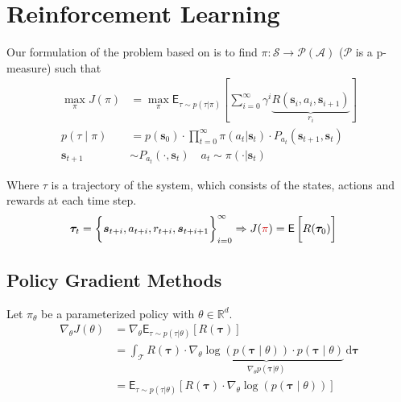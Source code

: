 \documentclass[a4paper,12pt, oneside, twocolumn]{scrartcl}
\newcommand{\rot}[2][rot]{\textcolor{#1}{#2}}
\begin{document}
\vspace{-1em} %

\section*{Reinforcement Learning}

Our formulation of the problem based on \cite{sutton_barto_2018} is 
to find $\pi: \mathcal{S} \to \mathcal{P}(\mathcal{A})$ ($\mathcal{P}$ is a p-measure) such that  
%
\begin{align*}
    \max_{\pi} J(\pi) &= \max_{\pi} \mathsf{E}_{\tau \sim p(\tau|\pi)} 
    \left[ 
        \sum_{i=0}^{\infty} \gamma^i \underbrace{R(\bm{s}_i, a_i, \bm{s}_{i+1})}_{r_i}
    \right]
    \\
    p(\tau \mid \pi) &= p(\bm{s}_0) \cdot \prod_{t=0}^{\infty} \pi(a_t|\bm{s}_t) \cdot P_{a_t}(\bm{s}_{t+1}, \bm{s}_t)
    \\
    \bm{s}_{t+1} &\sim P_{a_t}(\cdot , \bm{s}_t) 
    \quad
    a_t \sim \pi(\cdot | \bm{s}_t)
\end{align*}

Where $\tau$ is a trajectory of the system, which consists of the states, actions and rewards at each time step.
%
\small{
    \begin{align*}
        \bm{\tau}_t
        &=
        \left\{
            \vphantom{\int}
            \bm{s}_{t+i}, a_{t+i}, r_{t+i}, \bm{s}_{t+i+1} 
        \right\}_{i=0}^{\infty}
        \Rightarrow
        J(\rot{\pi}) 
        =
        \mathsf{E}
        \left[
            \vphantom{\int}
            R(\bm{\tau}_0)
        \right]
    \end{align*}
}

\subsection*{Policy Gradient Methods}

Let $\pi_{\theta}$ be a parameterized policy with $\theta \in \mathbb{R}^d$.
\begin{align*}
    \nabla_{\theta} J(\theta)
    &=
    \nabla_{\theta} \mathsf{E}_{\tau \sim p(\tau|\theta)}
    \left[
        R(\bm{\tau})
    \right]
    \\
    &= 
    \int_{\mathcal{T}} R(\bm{\tau}) \cdot 
    \underbrace{
        \nabla_{\theta} \log(p(\bm{\tau}\mid \theta)) \cdot p(\bm{\tau}\mid \theta)
    }_{\nabla_{\theta} p(\bm{\tau}|\theta)}
    \,\mathrm{d}\bm{\tau}
    \\
    &=
    \mathsf{E}_{\tau \sim p(\tau|\theta)}
    \left[
        R(\bm{\tau}) \cdot \nabla_{\theta} \log(p(\bm{\tau}\mid \theta))
    \right]
\end{align*}
\end{document}
